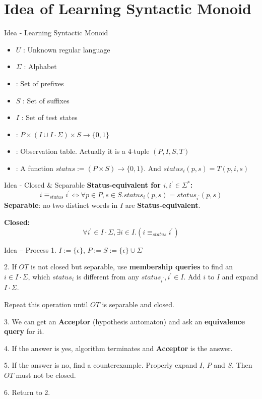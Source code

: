 \documentclass{beamer}
\begin{document}
\section{Idea of Learning Syntactic Monoid}
\begin{frame}{Idea - Learning Syntactic Monoid}
    \begin{itemize}
            \item $U$ : Unknown regular language
            \item $\Sigma$ : Alphabet
            \item \textbf{\color{red}{$P$}} : Set of prefixes
            \item $S$ : Set of suffixes
            \item $I$ : Set of test states
            \item \textbf{\color{red}{$T$}}: $P\times (I \cup I \cdot \Sigma) \times S \to \{0,1\}$
            \item \textbf{\color{red}{$OT$}} : {\small Observation table. Actually it is a 4-tuple} $(P,I,S,T)$
            \item \textbf{\color{red}{$status$}}: A function $status:= (P \times S) \rightarrow\{0,1\}$. And $status_i (p,s) = T(p,i,s)$
    \end{itemize}    
\end{frame}


\begin{frame}{Idea - Closed \& Separable}
\textbf{Status-equivalent for $i, i^{\prime}\in \Sigma^{*}$: }
$$
    i \equiv_{status} i^{\prime} \Leftrightarrow  \forall p \in P,s \in S. status_i(p,s) = status_{i^{\prime}}(p,s)
$$
\textbf{Separable}: no two distinct words in $I$ are \textbf{Status-equivalent}. 


\textbf{Closed: }
$$
    \forall i^{\prime} \in I\cdot \Sigma ,  \exists i \in I.(i \equiv_{status} i^{\prime})
$$


\end{frame}
\begin{frame}{Idea -- Process}
1. $I := \{\epsilon\}$, $P:=S:= \{\epsilon\} \cup \Sigma$

2. If $OT$ is not closed but separable, use \textbf{membership queries} to find an $i \in I \cdot \Sigma$, which $status_i$ is different from any $status_{i^{\prime}}, i^{\prime}\in I$. Add $i$ to $I$ and expand $I \cdot \Sigma$.

Repeat this operation until $OT$ is separable and closed.

3. We can get an \textbf{Acceptor} (hypothesis automaton) and ask an \textbf{equivalence query} for it. 

4. If the answer is yes, algorithm terminates and \textbf{Acceptor} is the answer. 

5. If the answer is no, find a counterexample. Properly expand $I$, $P$ and $S$. Then $OT$ must not be closed. 

6. Return to 2.

\end{frame}
\end{document}
